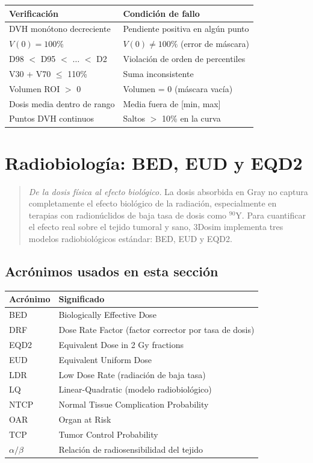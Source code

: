 \documentclass[12pt,a4paper]{article}
\begin{document}
\begin{tabular}{p{5cm} p{10cm}}
\toprule
\textbf{Verificación} & \textbf{Condición de fallo} \\
\midrule
DVH monótono decreciente & Pendiente positiva en algún punto \\
$V(0) = 100\%$ & $V(0) \neq 100\%$ (error de máscara) \\
D98 $<$ D95 $<$ $\ldots$ $<$ D2 & Violación de orden de percentiles \\
V30 + V70 $\leq$ 110\% & Suma inconsistente \\
Volumen ROI $>$ 0 & Volumen = 0 (máscara vacía) \\
Dosis media dentro de rango & Media fuera de [min, max] \\
Puntos DVH continuos & Saltos $>$ 10\% en la curva \\
\bottomrule
\end{tabular}

\newpage

\section{Radiobiología: BED, EUD y EQD2}

\begin{quote}
\textit{De la dosis física al efecto biológico.} La dosis absorbida en Gray no captura completamente el efecto biológico de la radiación, especialmente en terapias con radionúclidos de baja tasa de dosis como $^{90}$Y. Para cuantificar el efecto real sobre el tejido tumoral y sano, 3Dosim implementa tres modelos radiobiológicos estándar: BED, EUD y EQD2.
\end{quote}

\subsection*{Acrónimos usados en esta sección}

\begin{tabular}{p{3cm} p{12cm}}
\toprule
\textbf{Acrónimo} & \textbf{Significado} \\
\midrule
BED & Biologically Effective Dose \\
DRF & Dose Rate Factor (factor corrector por tasa de dosis) \\
EQD2 & Equivalent Dose in 2 Gy fractions \\
EUD & Equivalent Uniform Dose \\
LDR & Low Dose Rate (radiación de baja tasa) \\
LQ & Linear-Quadratic (modelo radiobiológico) \\
NTCP & Normal Tissue Complication Probability \\
OAR & Organ at Risk \\
TCP & Tumor Control Probability \\
$\alpha/\beta$ & Relación de radiosensibilidad del tejido \\
\bottomrule
\end{tabular}
\end{document}
